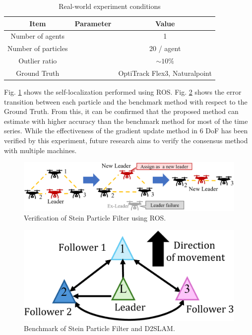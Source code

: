 \documentclass[a4paper,fleqn,10pt,twocolumn]{SICE_ISCS}
\begin{document}
\begin{table}[b]
	\begin{center}
		\caption{Real-world experiment conditions}
		\label{tab:real_world_conditions}
		\begin{tabular}{c c c} \hline
			Item & Parameter & Value \\ \hline
			Number of agents & & 1 \\
			Number of particles & & 20 / agent \\
			Outlier ratio & & $\sim 10\%$ \\
			Ground Truth & & OptiTrack Flex3, Naturalpoint \\ \hline
		\end{tabular}
	\end{center}
	\vspace{-1mm}
\end{table}

Fig. \ref{fig:ros_experiment} shows the self-localization performed using ROS. Fig. \ref{fig:error_comparison} shows the error transition between each particle and the benchmark method with respect to the Ground Truth. From this, it can be confirmed that the proposed method can estimate with higher accuracy than the benchmark method for most of the time series. While the effectiveness of the gradient update method in 6 DoF has been verified by this experiment, future research aims to verify the consensus method with multiple machines.

\begin{figure}[t]
	\begin{center}
		\includegraphics[width=\linewidth]{Fig/Nice_image_fault.eps}
		\caption{Verification of Stein Particle Filter using ROS.}
		\label{fig:ros_experiment}
	\end{center}
	\vspace{-2mm}
\end{figure}

\begin{figure}[t]
	\begin{center}
		\includegraphics[width=\linewidth]{Fig/Topology.eps}
		\caption{Benchmark of Stein Particle Filter and D2SLAM.}
		\label{fig:error_comparison}
	\end{center}
	\vspace{-2mm}
\end{figure}
\end{document}
